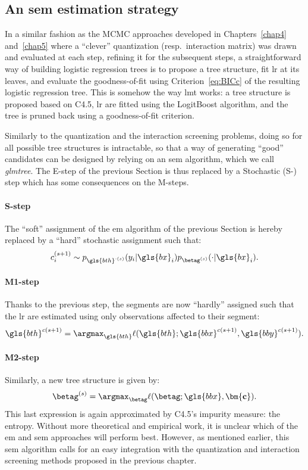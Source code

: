 \subsection{An \gls{sem} estimation strategy} \label{subsec:sem}

In a similar fashion as the MCMC approaches developed in Chapters~\ref{chap4} and~\ref{chap5} where a ``clever'' quantization (resp.\ interaction matrix) was drawn and evaluated at each step, refining it for the subsequent steps, a straightforward way of building logistic regression trees is to propose a tree structure, fit \gls{lr} at its leaves, and evaluate the goodness-of-fit using Criterion~\ref{eq:BICc} of the resulting logistic regression tree. This is somehow the way \gls{lmt} works: a tree structure is proposed based on C4.5, \gls{lr} are fitted using the LogitBoost algorithm, and the tree is pruned back using a goodness-of-fit criterion.

Similarly to the quantization and the interaction screening problems, doing so for all possible tree structures is intractable, so that a way of generating ``good'' candidates can be designed by relying on an \gls{sem} algorithm, which we call \textit{glmtree}. The E-step of the previous Section is thus replaced by a Stochastic (S-) step which has some consequences on the M-steps.
\paragraph{S-step} The ``soft'' assignment of the \gls{em} algorithm of the previous Section is hereby replaced by a ``hard'' stochastic assignment such that:
\[ c_i^{(s+1)} \sim p_{\gls{bth}^{\cdot(s)}}(y_i | \gls{bx}_i) p_{\betag^{(s)}}(\cdot | \gls{bx}_i). \]
\paragraph{M1-step} Thanks to the previous step, the segments are now ``hardly'' assigned such that the \gls{lr} are estimated using only observations affected to their segment:
\[ \gls{bth}^{c(s+1)} = \argmax_{\gls{bth}} \ell(\gls{bth};\gls{bbx}^{c(s+1)},\gls{bby}^{c(s+1)}). \]
\paragraph{M2-step} Similarly, a new tree structure is given by:
\[ \betag^{(s)} = \argmax_{\betag} \ell(\betag; \gls{bbx}, \mathbf{\bm{c}}). \]
This last expression is again approximated by C4.5's impurity measure: the entropy. Without more theoretical and empirical work, it is unclear which of the \gls{em} and \gls{sem} approaches will perform best. However, as mentioned earlier, this \gls{sem} algorithm calls for an easy integration with the quantization and interaction screening methods proposed in the previous chapter.

